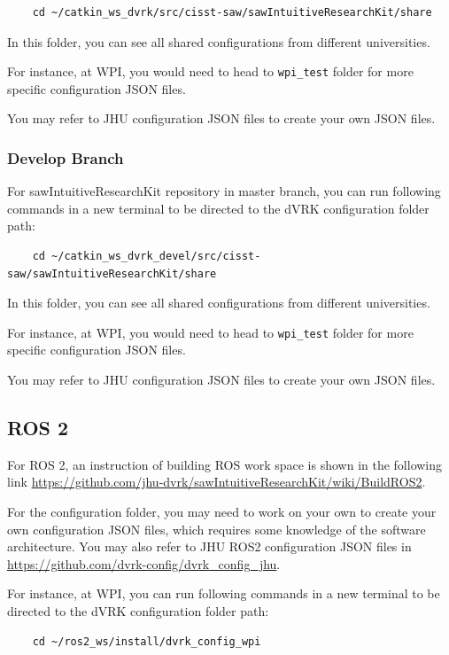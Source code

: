 \begin{verbatim}
    cd ~/catkin_ws_dvrk/src/cisst-saw/sawIntuitiveResearchKit/share
\end{verbatim}

In this folder, you can see all shared configurations from different universities. 

For instance, at WPI, you would need to head to \texttt{wpi\_test} folder for more specific configuration JSON files.

You may refer to JHU configuration JSON files to create your own JSON files.

\subsubsection{Develop Branch}

For sawIntuitiveResearchKit repository in master branch, you can run following commands in a new terminal to be directed to the dVRK configuration folder path:

\begin{verbatim}
    cd ~/catkin_ws_dvrk_devel/src/cisst-saw/sawIntuitiveResearchKit/share
\end{verbatim}

In this folder, you can see all shared configurations from different universities. 

For instance, at WPI, you would need to head to \texttt{wpi\_test} folder for more specific configuration JSON files.

You may refer to JHU configuration JSON files to create your own JSON files.

\subsection{ROS 2}

For ROS 2, an instruction of building ROS work space is shown in the following link \url{https://github.com/jhu-dvrk/sawIntuitiveResearchKit/wiki/BuildROS2}.

For the configuration folder, you may need to work on your own to create your own configuration JSON files, which requires some knowledge of the software architecture. You may also refer to JHU ROS2 configuration JSON files in \url{https://github.com/dvrk-config/dvrk_config_jhu}. 

For instance, at WPI, you can run following commands in a new terminal to be directed to the dVRK configuration folder path:

\begin{verbatim}
    cd ~/ros2_ws/install/dvrk_config_wpi
\end{verbatim}

